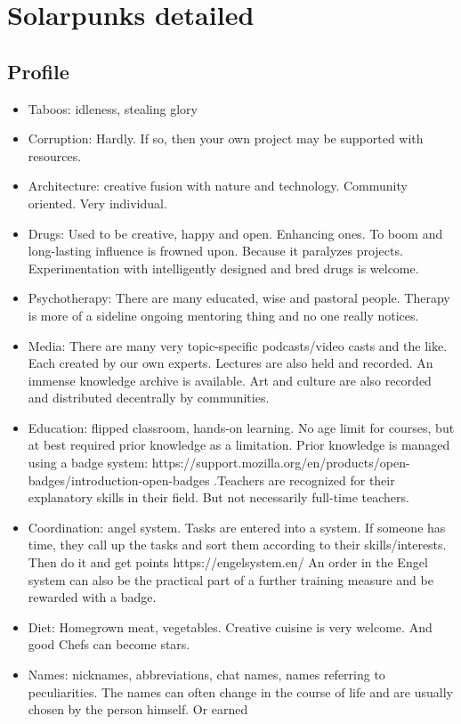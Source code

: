 \chapter {Solarpunks detailed}


\section{Profile}
\begin{itemize}
    \item Taboos: idleness, stealing glory
    \item Corruption: Hardly. If so, then your own project may be supported with resources.
    \item Architecture: creative fusion with nature and technology. Community oriented. Very individual.
    \item Drugs: Used to be creative, happy and open. Enhancing ones. To boom and long-lasting influence is frowned upon. Because it paralyzes projects. Experimentation with intelligently designed and bred drugs is welcome.
    \item Psychotherapy: There are many educated, wise and pastoral people. Therapy is more of a sideline ongoing mentoring thing and no one really notices.
    \item Media: There are many very topic-specific podcasts/video casts and the like. Each created by our own experts. Lectures are also held and recorded. An immense knowledge archive is available. Art and culture are also recorded and distributed decentrally by communities.
    \item Education: flipped classroom, hands-on learning. No age limit for courses, but at best required prior knowledge as a limitation. Prior knowledge is managed using a badge system: https://support.mozilla.org/en/products/open-badges/introduction-open-badges .Teachers are recognized for their explanatory skills in their field. But not necessarily full-time teachers.
    \item Coordination: angel system. Tasks are entered into a system. If someone has time, they call up the tasks and sort them according to their skills/interests. Then do it and get points https://engelsystem.en/ An order in the Engel system can also be the practical part of a further training measure and be rewarded with a badge.
    \item Diet: Homegrown meat, vegetables. Creative cuisine is very welcome. And good Chefs can become stars.
    \item Names: nicknames, abbreviations, chat names, names referring to peculiarities. The names can often change in the course of life and are usually chosen by the person himself. Or earned
\end{itemize}

